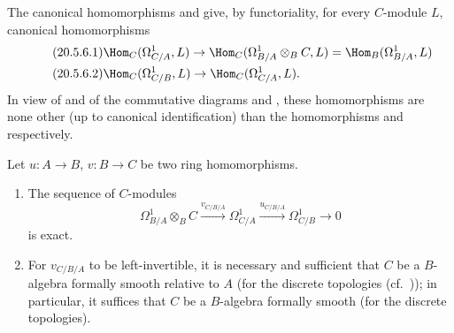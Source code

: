 \begin{env}[20.5.6]
\label{0.20.5.6}
The canonical homomorphisms  and  give, by functoriality, for every $C$-module $L$, canonical homomorphisms
\begin{align}
\tag{20.5.6.1}
  \label{0.20.5.6.1}
  &\Hom_C(\Omega^1_{C/A},L)\to\Hom_C(\Omega^1_{B/A}\otimes_B C,L)=\Hom_B(\Omega^1_{B/A},L) \\
\tag{20.5.6.2}
  \label{0.20.5.6.2}
  &\Hom_C(\Omega^1_{C/B},L)\to\Hom_C(\Omega^1_{C/A},L).
\end{align}
In view of  and of the commutative diagrams  and , these homomorphisms are none other (up to canonical identification) than the homomorphisms  and  respectively.
\end{env}

\begin{theorem}[20.5.7]
\label{0.20.5.7}
Let $u:A\to B$, $v:B\to C$ be two ring homomorphisms.
\begin{enumerate}
  \item[\rm(i)] The sequence of $C$-modules
\begin{equation}
\tag{20.5.7.1}
  \label{0.20.5.7.1}
  \Omega^1_{B/A}\otimes_B C\xrightarrow{v_{C/B/A}}\Omega^1_{C/A}\xrightarrow{u_{C/B/A}}\Omega^1_{C/B}\to 0
\end{equation}
is exact.
  \item[\rm(ii)] For $v_{C/B/A}$ to be left-invertible, it is necessary and sufficient that $C$ be a $B$-algebra formally smooth relative to $A$ \textup{(}for the discrete topologies \textup{(}cf.\ \textup{))}; in particular, it suffices that $C$ be a $B$-algebra formally smooth \textup{(}for the discrete topologies\textup{)}.
\end{enumerate}
\end{theorem}

